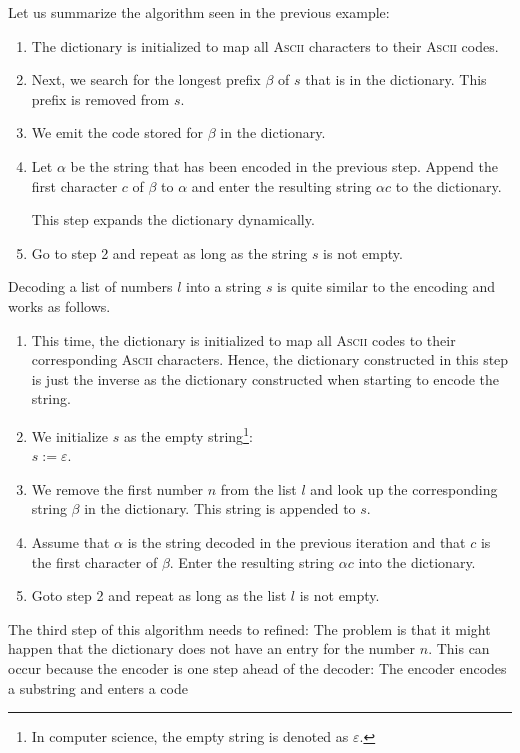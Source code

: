Let us summarize the algorithm seen in the previous example:
\begin{enumerate}
\item The dictionary is initialized to map all \textsc{Ascii} characters to their \textsc{Ascii} codes.
\item Next, we search for the longest prefix $\beta$ of $s$ that is in the dictionary.  This prefix
      is removed from $s$.
\item We emit the code stored for $\beta$ in the dictionary.
\item Let $\alpha$ be the string that has been encoded in the previous step.  Append the first
      character $c$ of $\beta$ to $\alpha$ and enter the resulting string $\alpha c$ to the
      dictionary.

      This step expands the dictionary dynamically.
\item Go to step 2 and repeat as long as the string $s$ is not empty.
\end{enumerate}
Decoding a list of numbers $l$ into a string $s$ is quite similar to the encoding and works as follows.
\begin{enumerate}
\item This time, the dictionary is initialized to map all \textsc{Ascii} codes to their corresponding
      \textsc{Ascii} characters.  Hence, the dictionary constructed in this step is just the inverse
      as the dictionary constructed when starting to encode the string.
\item We initialize $s$ as the 
      empty string\footnote{In computer science, the empty string is denoted as $\varepsilon$.}:
      \\[0.2cm]
      \hspace*{1.3cm}
      $s := \varepsilon$.
\item We remove the first number $n$ from the list $l$ and look up the corresponding
      string $\beta$ in the dictionary.  This string is appended to $s$.
\item Assume that $\alpha$ is the string decoded in the previous iteration and that $c$ is the first
      character of $\beta$.  Enter the resulting string $\alpha c$ into the dictionary.
\item Goto step 2 and repeat as long as the list $l$ is not empty.
\end{enumerate}
The third step of this algorithm needs to refined:  The problem is
that it might happen that the dictionary does not have an entry for the number $n$.  This can occur because
the encoder is one step ahead of the decoder: The encoder encodes a substring and enters a code
